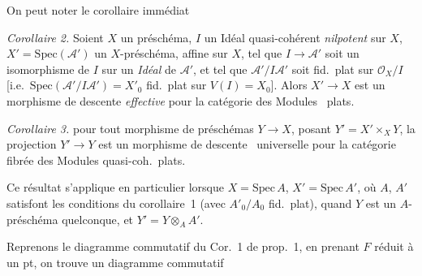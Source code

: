 \documentclass[11pt,a4paper]{article}
\begin{document}

On peut \struck{\ill{}} noter le corollaire immédiat

\emph{Corollaire 2.} Soient  $X$ un préschéma, $I$ un Idéal
quasi-cohérent \emph{nilpotent} sur $X$, $X' = \mathrm{Spec}(\mathcal{A}')$
un $X$-préschéma, affine sur $X$, tel que $I \to \mathcal{A}'$ soit un
isomorphisme de $I$ sur un \emph{Idéal} de $\mathcal{A}'$, et tel que
$\mathcal{A}'/I\mathcal{A}'$ soit fid.\ plat sur $\mathcal{O}_X/I$
[i.e.\ $\mathrm{Spec}(\mathcal{A}'/I\mathcal{A}') = X'_0$ fid.\ plat sur
$V(I) = X_0$]. Alors $X' \to X$ est un morphisme de descente
\emph{effective} pour la catégorie  des Modules
\ plats.

 

\emph{Corollaire 3.} 
 pour tout morphisme  de préschémas
$Y \to X$, posant $Y' = X' \times_X Y$, la projection $Y' \to Y$ est un
morphisme de descente \ universelle pour la catégorie
fibrée des Modules quasi-coh.\ plats.


Ce résultat s'applique en particulier lorsque $X = \mathrm{Spec}\, A$,
$X' = \mathrm{Spec}\, A'$, où $A$, $A'$ satisfont les conditions du
corollaire~1 (avec $A'_0/A_0$ fid.\ plat), quand $Y$ est un
$A$-préschéma quelconque, et $Y' = Y \otimes_A A'$.

 Reprenons le diagramme commutatif du
Cor.~1 de prop.~1, en \struck{\ill{}} prenant $F$ réduit à un pt, on
trouve un diagramme commutatif

\end{document}
